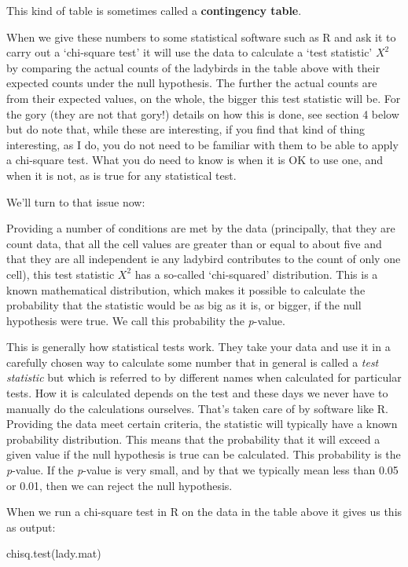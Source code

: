 \documentclass[
  letterpaper,
  DIV=11,
  numbers=noendperiod]{scrreprt}
\newenvironment{Shaded}{\begin{snugshade}}{\end{snugshade}}
\newcommand{\FunctionTok}[1]{\textcolor[rgb]{0.28,0.35,0.67}{#1}}
\newcommand{\NormalTok}[1]{\textcolor[rgb]{0.00,0.23,0.31}{#1}}
\begin{document}
This kind of table is sometimes called a \textbf{contingency table}.

When we give these numbers to some statistical software such as R and
ask it to carry out a `chi-square test' it will use the data to
calculate a `test statistic' \(X^2\) by comparing the actual counts of
the ladybirds in the table above with their expected counts under the
null hypothesis. The further the actual counts are from their expected
values, on the whole, the bigger this test statistic will be. For the
gory (they are not that gory!) details on how this is done, see section
4 below but do note that, while these are interesting, if you find that
kind of thing interesting, as I do, you do not need to be familiar with
them to be able to apply a chi-square test. What you do need to know is
when it is OK to use one, and when it is not, as is true for any
statistical test.

We'll turn to that issue now:

Providing a number of conditions are met by the data (principally, that
they are count data, that all the cell values are greater than or equal
to about five and that they are all independent ie any ladybird
contributes to the count of only one cell), this test statistic \(X^2\)
has a so-called `chi-squared' distribution. This is a known mathematical
distribution, which makes it possible to calculate the probability that
the statistic would be as big as it is, or bigger, if the null
hypothesis were true. We call this probability the \emph{p}-value.

This is generally how statistical tests work. They take your data and
use it in a carefully chosen way to calculate some number that in
general is called a \emph{test statistic} but which is referred to by
different names when calculated for particular tests. How it is
calculated depends on the test and these days we never have to manually
do the calculations ourselves. That's taken care of by software like R.
Providing the data meet certain criteria, the statistic will typically
have a known probability distribution. This means that the probability
that it will exceed a given value if the null hypothesis is true can be
calculated. This probability is the \emph{p}-value. If the
\emph{p}-value is very small, and by that we typically mean less than
0.05 or 0.01, then we can reject the null hypothesis.

When we run a chi-square test in R on the data in the table above it
gives us this as output:

\begin{Shaded}
\begin{Highlighting}[]
\FunctionTok{chisq.test}\NormalTok{(lady.mat)}
\end{Highlighting}
\end{Shaded}
\end{document}
